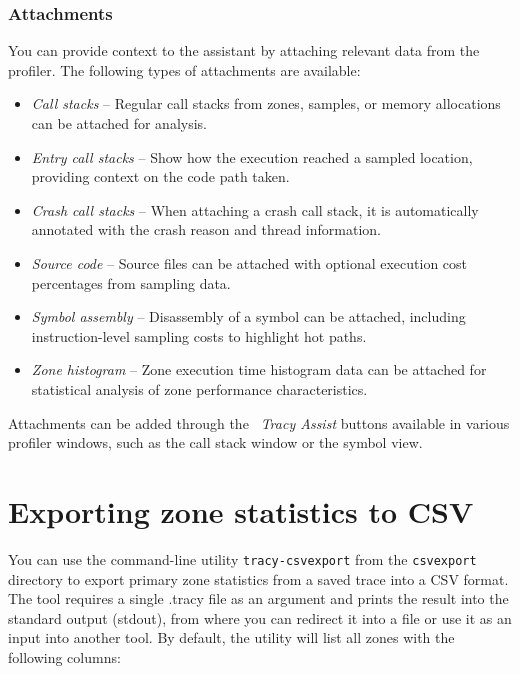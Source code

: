 \documentclass[hidelinks,titlepage,a4paper,twoside]{article}
\begin{document}
\subsubsection{Attachments}

You can provide context to the assistant by attaching relevant data from the profiler. The following types of attachments are available:

\begin{itemize}
\item \emph{Call stacks} -- Regular call stacks from zones, samples, or memory allocations can be attached for analysis.
\item \emph{Entry call stacks} -- Show how the execution reached a sampled location, providing context on the code path taken.
\item \emph{Crash call stacks} -- When attaching a crash call stack, it is automatically annotated with the crash reason and thread information.
\item \emph{Source code} -- Source files can be attached with optional execution cost percentages from sampling data.
\item \emph{Symbol assembly} -- Disassembly of a symbol can be attached, including instruction-level sampling costs to highlight hot paths.
\item \emph{Zone histogram} -- Zone execution time histogram data can be attached for statistical analysis of zone performance characteristics.
\end{itemize}

Attachments can be added through the \emph{\faRobot{}~Tracy Assist} buttons available in various profiler windows, such as the call stack window or the symbol view.

\section{Exporting zone statistics to CSV}
\label{csvexport}

You can use the command-line utility \texttt{tracy-csvexport} from the \texttt{csvexport} directory to export primary zone statistics from a saved trace into a CSV format.
The tool requires a single .tracy file as an argument and prints the result into the standard output (stdout), from where you can redirect it into a file or use it as an input into another tool.
By default, the utility will list all zones with the following columns:
\end{document}
